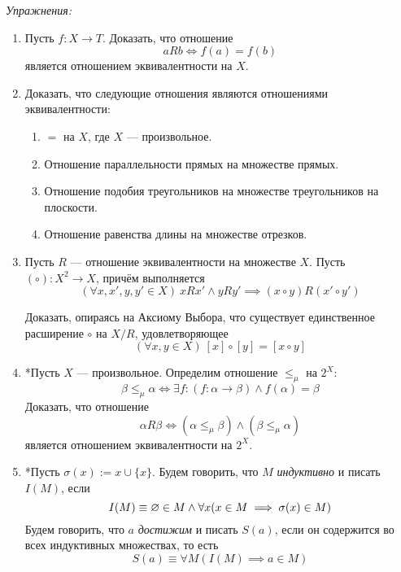 \vspace{1em}
{\it Упражнения:}
\begin{enumerate}
	\item{}Пусть $f:X\to T$. Доказать, что отношение\label{ex:fn_equiv}
	\[
		aRb\iff f(a)=f(b)
	\]
	является отношением эквивалентности на $X$.

	\item{}Доказать, что следующие отношения являются отношениями эквивалентности:
	\begin{enumerate}
		\item{}$=$ на $X$, где $X$ --- произвольное.
		\item{}Отношение параллельности прямых на множестве прямых.
		\item{}Отношение подобия треугольников на множестве треугольников
		на плоскости.
		\item{}Отношение равенства длины на множестве отрезков.
	\end{enumerate}

	\item{}Пусть $R$ --- отношение эквивалентности на множестве $X$.
	Пусть $(\circ):X^{2}\to X$, причём выполняется
	\[
		(\forall x,x',y,y'\in X)~xRx'\land yRy'\implies (x\circ y)R(x'\circ y')
	\]

	Доказать, опираясь на Аксиому Выбора,
	что существует единственное расширение $\circ$ на $X/R$, удовлетворяющее
	\[
		(\forall x,y\in X)~[x]\circ[y]=[x\circ y]
	\]

	\item{}*Пусть $X$ --- произвольное.
	Определим отношение $\leq_{\mu}$ на $2^{X}$:
	\[
		\beta\leq_{\mu}\alpha\iff \exists f:(f:\alpha\to\beta)\land f(\alpha)=\beta
	\]
	Доказать, что отношение
	\[
		\alpha R\beta\iff (\alpha\leq_{\mu}\beta)\land (\beta\leq_{\mu}\alpha)
	\]
	является отношением эквивалентности на $2^{X}$.

	\item{}*Пусть $\sigma(x):=x\cup\{x\}$. Будем говорить, что $M$
	{\it индуктивно}
	и писать $I(M)$, если
	\[
		I(M)\equiv \varnothing\in M\land \forall x(x\in M\implies \sigma(x)\in M)
	\]
	Будем говорить, что $a$ {\it достижим}
	 и писать $S(a)$,
	если он содержится во всех индуктивных множествах, то есть
	\[
		S(a)\equiv \forall M(I(M)\implies a\in M)
	\]


\end{enumerate}
